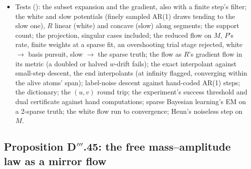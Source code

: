 \begin{itemize}
    pursuit's in 0.40--0.45 and 0.25. (J) At the same physical noise (AR(1) of correlation time 50, per-step
    $\sigma = 0.1$) $\Delta\log P$ off the truth's support is $-2.39$ under Euler's step 0.5, $-0.278$ under Euler's step
    0.125 and $-0.097$ under Heun's step 0.5 (25 times less): the selection is the explicit scheme's.
  \item Tests (): the subset expansion and the gradient, also with a finite step's
    filter; the white and slow potentials (finely sampled AR(1) draws tending to the slow one), $R$ linear (white) and
    concave (slow) along segments; the support count; the projection, singular cases included; the reduced flow on
    $M$, $P$'s rate, finite weights at a sparse fit, an overshooting trial stage rejected, white $\to$ basis pursuit,
    slow $\to$ the sparse truth; the flow as $R$'s gradient flow in its metric (a doubled or halved $w$-drift fails); the
    exact interpolant against small-step descent, the end interpolants (at infinity flagged, converging within the alive
    atoms' span); label-noise descent against hand-coded AR(1) steps; the dictionary; the $(u,v)$ round trip; the
    experiment's success threshold and dual certificate against hand computations; sparse Bayesian learning's EM on a
    2-sparse truth; the white flow run to convergence; Heun's noiseless step on $M$.
\end{itemize}

\subsection{Proposition D\texorpdfstring{$'''$}{'''}.45: the free mass--amplitude law as a mirror flow}

